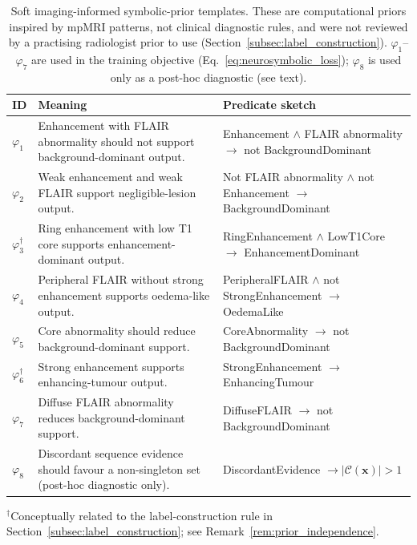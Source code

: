 \documentclass[preprint,11pt]{elsarticle}
\newcommand{\C}{\mathcal{C}}
\begin{document}
\begin{table}[H]
\centering
\caption{Soft imaging-informed symbolic-prior templates. These are computational priors inspired by mpMRI patterns, not clinical diagnostic rules, and were not reviewed by a practising radiologist prior to use (Section~\ref{subsec:label_construction}). $\varphi_1$--$\varphi_7$ are used in the training objective (Eq.~\eqref{eq:neurosymbolic_loss}); $\varphi_8$ is used only as a post-hoc diagnostic (see text).}
\label{tab:axioms}
\scriptsize
\begin{tabularx}{\textwidth}{p{0.8cm}Y Y}
\toprule
\textbf{ID} & \textbf{Meaning} & \textbf{Predicate sketch} \\
\midrule
$\varphi_1$ & Enhancement with FLAIR abnormality should not support background-dominant output. & Enhancement $\wedge$ FLAIR abnormality $\rightarrow$ not BackgroundDominant \\
$\varphi_2$ & Weak enhancement and weak FLAIR support negligible-lesion output. & Not FLAIR abnormality $\wedge$ not Enhancement $\rightarrow$ BackgroundDominant \\
$\varphi_3^{\dagger}$ & Ring enhancement with low T1 core supports enhancement-dominant output. & RingEnhancement $\wedge$ LowT1Core $\rightarrow$ EnhancementDominant \\
$\varphi_4$ & Peripheral FLAIR without strong enhancement supports oedema-like output. & PeripheralFLAIR $\wedge$ not StrongEnhancement $\rightarrow$ OedemaLike \\
$\varphi_5$ & Core abnormality should reduce background-dominant support. & CoreAbnormality $\rightarrow$ not BackgroundDominant \\
$\varphi_6^{\dagger}$ & Strong enhancement supports enhancing-tumour output. & StrongEnhancement $\rightarrow$ EnhancingTumour \\
$\varphi_7$ & Diffuse FLAIR abnormality reduces background-dominant support. & DiffuseFLAIR $\rightarrow$ not BackgroundDominant \\
$\varphi_8$ & Discordant sequence evidence should favour a non-singleton set (post-hoc diagnostic only). & DiscordantEvidence $\rightarrow |\C(\mathbf{x})|>1$ \\
\bottomrule
\end{tabularx}
\vspace{2pt}
\scriptsize $^{\dagger}$Conceptually related to the label-construction rule in Section~\ref{subsec:label_construction}; see Remark~\ref{rem:prior_independence}.
\end{table}
\end{document}
